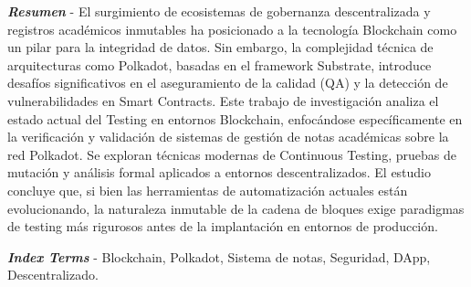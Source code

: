 \textbf{\textit{Resumen}} - El surgimiento de ecosistemas de gobernanza descentralizada y registros académicos inmutables ha posicionado a la tecnología Blockchain como un pilar para la integridad de datos. Sin embargo, la complejidad técnica de arquitecturas como Polkadot, basadas en el framework Substrate, introduce desafíos significativos en el aseguramiento de la calidad (QA) y la detección de vulnerabilidades en Smart Contracts. Este trabajo de investigación analiza el estado actual del Testing en entornos Blockchain, enfocándose específicamente en la verificación y validación de sistemas de gestión de notas académicas sobre la red Polkadot. Se exploran técnicas modernas de Continuous Testing, pruebas de mutación y análisis formal aplicados a entornos descentralizados. El estudio concluye que, si bien las herramientas de automatización actuales están evolucionando, la naturaleza inmutable de la cadena de bloques exige paradigmas de testing más rigurosos antes de la implantación en entornos de producción.
\vspace{0.5em}

\textbf{\textit{Index Terms}} - Blockchain, Polkadot, Sistema de notas, Seguridad, DApp, Descentralizado.